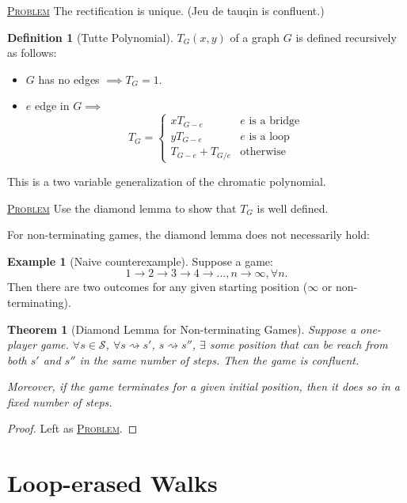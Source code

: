 \documentclass{report}
\newcommand{\fancyem}[1]{\underline{\textsc{#1}}}
\newtheorem{theorem}{Theorem}[section]
\theoremstyle{definition}
\newtheorem{definition}{Definition}[section]
\newtheorem{example}{Example}[section]
\theoremstyle{remark}
\numberwithin{equation}{section}
\begin{document}
\fancyem{Problem} The rectification is unique. (Jeu de tauqin is confluent.)

\begin{definition}[Tutte Polynomial]
    $T_G(x, y)$ of a graph $G$ is defined recursively as follows:
    \begin{itemize}
        \item $G$ has no edges $\implies T_G = 1$.
        \item $e$ edge in $G \implies$ \[
            T_G = \begin{cases}
                xT_{G - e} & e \text{ is a bridge} \\
                yT_{G - e} & e \text{ is a loop} \\
                T_{G - e} + T_{G / e} & \text{otherwise}
            \end{cases}    
        \]
    \end{itemize}
\end{definition}
This is a two variable generalization of the chromatic polynomial.

\fancyem{Problem} Use the diamond lemma to show that $T_G$ is well defined.

For non-terminating games, the diamond lemma does not necessarily hold:
\begin{example}[Naive counterexample]
    Suppose a game:
    \[
        1 \to 2 \to 3 \to 4 \to \ldots, n \to \infty, \forall n.
    \]
    Then there are two outcomes for any given starting position ($\infty$ or non-terminating).
\end{example}

\begin{theorem}[Diamond Lemma for Non-terminating Games]
    Suppose a one-player game. $\forall s \in \mathcal{S}$, $\forall s \rightsquigarrow s'$, $s \rightsquigarrow s''$, $\exists$ some position that can be reach from both $s'$ and $s''$ in the same number of steps. Then the game is confluent.

    Moreover, if the game terminates for a given initial position, then it does so in a fixed number of steps.
\end{theorem}
\begin{proof}
    Left as \fancyem{Problem}.
\end{proof}

\section{Loop-erased Walks}
\end{document}
